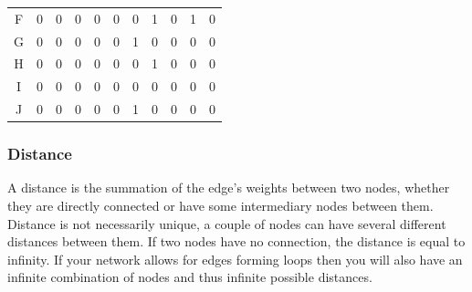 \begin{table}[h!]
\begin{tabular}{|c|cccccccccc|}
    {\cellcolor[rgb]{0.604,1,0.6}}F & 0                            & 0                            & 0                            & 0                            & 0                            & 0                            & 1                            & 0                            & 1                            & 0                             \\
    {\cellcolor[rgb]{0.604,1,0.6}}G & 0                            & 0                            & 0                            & 0                            & 0                            & 1                            & 0                            & 0                            & 0                            & 0                             \\
    {\cellcolor[rgb]{0.604,1,0.6}}H & 0                            & 0                            & 0                            & 0                            & 0                            & 0                            & 1                            & 0                            & 0                            & 0                             \\
    {\cellcolor[rgb]{0.604,1,0.6}}I & 0                            & 0                            & 0                            & 0                            & 0                            & 0                            & 0                            & 0                            & 0                            & 0                             \\
    {\cellcolor[rgb]{0.604,1,0.6}}J & 0                            & 0                            & 0                            & 0                            & 0                            & 1                            & 0                            & 0                            & 0                            & 0                             \\
    \hline
    \end{tabular}
\end{table}


\subsubsection{Distance}

A distance is the summation of the edge's weights between two nodes, whether they are directly connected or have some intermediary nodes between them. Distance is not necessarily unique, a couple of nodes can have several different distances between them. If two nodes have no connection, the distance is equal to infinity. If your network allows for edges forming loops then you will also have an infinite combination of nodes and thus infinite possible distances.

